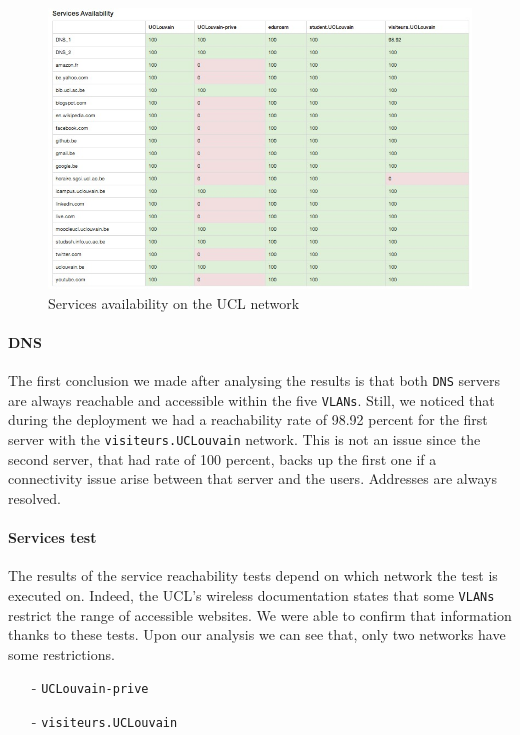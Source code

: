 \begin{figure}[H]
	\centering
   \includegraphics[width=1\textwidth]{Pictures/chapter6/services.jpg}
   \caption{Services availability on the UCL network}
\end{figure} 


\paragraph*{DNS} The first conclusion we made after analysing the results is that both \texttt{DNS} servers are always reachable and accessible within the five \texttt{VLANs}. Still, we noticed that during the deployment we had a reachability rate of 98.92 percent for the first server with the \texttt{visiteurs.UCLouvain} network. This is not an issue since the second server, that had rate of 100 percent, backs up the first one if a connectivity issue arise between that server and the users. Addresses are always resolved.

\paragraph*{Services test} The results of the service reachability tests depend on which network the test is executed on. Indeed, the UCL's wireless documentation states that some \texttt{VLANs} restrict the range of accessible websites. We were able to confirm that information thanks to these tests. Upon our analysis we can see that, only two networks have some restrictions.

\begin{itemize}
	\item [-] \texttt{UCLouvain-prive}
	\item [-] \texttt{visiteurs.UCLouvain}
\end{itemize}

